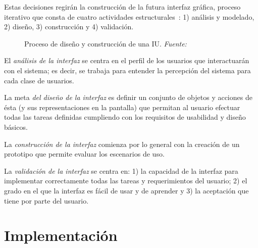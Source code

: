 Estas decisiones regirán la construcción de la futura interfaz gráfica, proceso iterativo que consta de cuatro actividades estructurales~\cite{Man97}: 1) análisis y modelado, 2) diseño, 3) construcción y 4) validación.

\begin{figure} [!htb]
	\centering
	\caption[Proceso de diseño y construcción de una IU]{Proceso de diseño y construcción de una IU. \textit{Fuente:~\cite{Pre10}}}
	\label{fig:disenoIU}
\end{figure}

El \emph{análisis de la interfaz} se centra en el perfil de los usuarios que interactuarán con el sistema; es decir, se trabaja para entender la percepción del sistema para cada clase de usuarios.

La meta \emph{del diseño de la interfaz} es definir un conjunto de objetos y acciones de ésta (y sus representaciones en la pantalla) que permitan al usuario efectuar todas las tareas definidas cumpliendo con los requisitos de usabilidad y diseño básicos.

La \emph{construcción de la interfaz} comienza por lo general con la creación de un prototipo que
permite evaluar los escenarios de uso.

La \emph{validación de la interfaz} se centra en: 1) la capacidad de la interfaz para implementar
correctamente todas las tareas y requerimientos del usuario; 2) el grado en el que la interfaz es fácil de usar y de aprender y 3) la aceptación que tiene por parte del usuario.



\section{Implementación}
\label{sec:secModeloImp}

